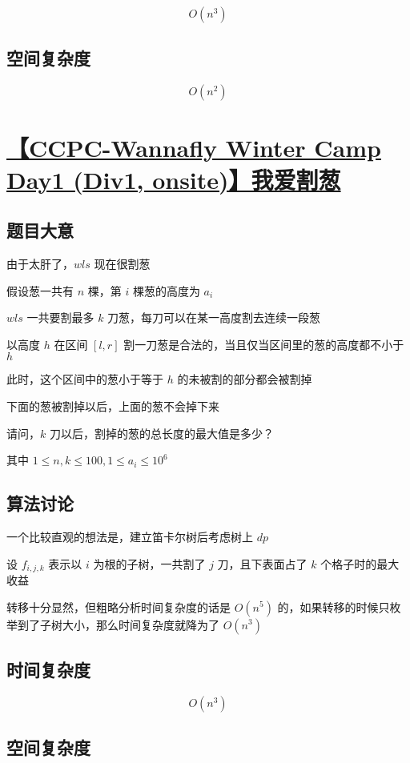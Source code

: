 \documentclass[UTF8]{article}
\begin{document}
$$
O(n^3)
$$

\subsection{空间复杂度}

$$
O(n^2)
$$

\section{\href{https://zhixincode.com/contest/2/problem/H?problem_id=30}{【CCPC-Wannafly Winter Camp Day1 (Div1, onsite)】我爱割葱}}

\subsection{题目大意}

由于太肝了，$wls$ 现在很割葱

假设葱一共有 $n$ 棵，第 $i$ 棵葱的高度为 $a_i$

$wls$ 一共要割最多 $k$ 刀葱，每刀可以在某一高度割去连续一段葱

以高度 $h$ 在区间 $[l, r]$ 割一刀葱是合法的，当且仅当区间里的葱的高度都不小于 $h$

此时，这个区间中的葱小于等于 $h$ 的未被割的部分都会被割掉

下面的葱被割掉以后，上面的葱不会掉下来

请问，$k$ 刀以后，割掉的葱的总长度的最大值是多少？

其中 $1 \le n, k \le 100, 1 \le a_i \le 10^6$

\subsection{算法讨论}

一个比较直观的想法是，建立笛卡尔树后考虑树上 $dp$

设 $f_{i,j,k}$ 表示以 $i$ 为根的子树，一共割了 $j$ 刀，且下表面占了 $k$ 个格子时的最大收益

转移十分显然，但粗略分析时间复杂度的话是 $O(n^5)$ 的，如果转移的时候只枚举到了子树大小，那么时间复杂度就降为了 $O(n^3)$

\subsection{时间复杂度}

$$
O(n^3)
$$

\subsection{空间复杂度}
\end{document}

